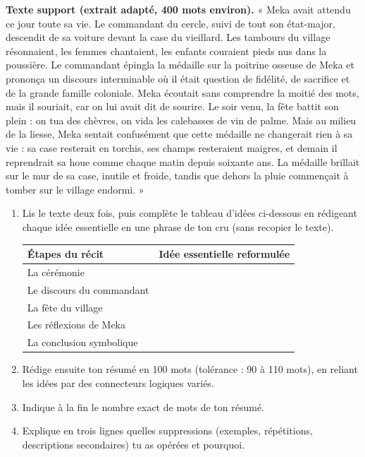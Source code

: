 \documentclass[11pt]{article}
\begin{document}
\begin{exercice}
\textbf{Texte support (extrait adapté, 400 mots environ).} « Meka avait attendu ce jour toute sa vie. Le commandant du cercle, suivi de tout son état-major, descendit de sa voiture devant la case du vieillard. Les tambours du village résonnaient, les femmes chantaient, les enfants couraient pieds nus dans la poussière. Le commandant épingla la médaille sur la poitrine osseuse de Meka et prononça un discours interminable où il était question de fidélité, de sacrifice et de la grande famille coloniale. Meka écoutait sans comprendre la moitié des mots, mais il souriait, car on lui avait dit de sourire. Le soir venu, la fête battit son plein : on tua des chèvres, on vida les calebasses de vin de palme. Mais au milieu de la liesse, Meka sentait confusément que cette médaille ne changerait rien à sa vie : sa case resterait en torchis, ses champs resteraient maigres, et demain il reprendrait sa houe comme chaque matin depuis soixante ans. La médaille brillait sur le mur de sa case, inutile et froide, tandis que dehors la pluie commençait à tomber sur le village endormi. »
\begin{enumerate}
\item Lis le texte deux fois, puis complète le tableau d'idées ci-dessous en rédigeant chaque idée essentielle en une phrase de ton cru (sans recopier le texte).
\begin{center}
\begin{tabularx}{\linewidth}{|l|X|}\hline
\rowcolor{popblueL} \textbf{Étapes du récit} & \textbf{Idée essentielle reformulée} \\ \hline
La cérémonie & \\ \hline
Le discours du commandant & \\ \hline
La fête du village & \\ \hline
Les réflexions de Meka & \\ \hline
La conclusion symbolique & \\ \hline
\end{tabularx}
\end{center}
\item Rédige ensuite ton résumé en 100 mots (tolérance : 90 à 110 mots), en reliant les idées par des connecteurs logiques variés.
\item Indique à la fin le nombre exact de mots de ton résumé.
\item Explique en trois lignes quelles suppressions (exemples, répétitions, descriptions secondaires) tu as opérées et pourquoi.
\end{enumerate}
\end{exercice}
\end{document}
